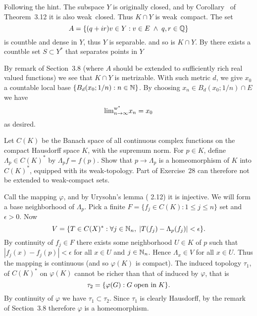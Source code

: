 \begin{enumerate}
\begin{itemize}
Following the hint.
The subspace $Y$ is originally closed, and by Corollary~
of Theorem~3.12 it is also weak\upstar\ closed.
Thus \(K \cap Y\) is weak\upstar\ compact.
The set
\begin{equation*}
A = \{(q+ir)v \in Y: v\in E \;\wedge\; q,r \in \mathbb{Q}\}
\end{equation*}
is countble and dense in $Y$, thus $Y$ is separable.
and so is \(K \cap Y\).
By  there exists a countble set \(S \subset Y^*\) that separates
points in $Y$

By remark  of Section~3.8
(where $A$ should be extended to sufficiently rich real valued functions)
we see that  \(K \cap Y\) is metrizable.
With such metric $d$, we give \(x_0\) a countable local base
 \(\{B_d(x_0;1/n): n\in\mathbb{N}\}\).
By choosing \(x_n \in B_d(x_0;1/n) \cap E\) we have 
\begin{equation*}
{\lim}_{n\to\infty}^{\textnormal{w}^*} x_n = x_0
\end{equation*}
as desired.
\end{itemize}


\begin{excopy}
Let \(C(K)\) be the Banach space of all continuous complex functions on the
compact Hausdorff space $K$, with the supremum norm.
For \(p\in K\), define \(\Lambda_p\in C(K)^*\) by \(\Lambda_p f = f(p)\).
Show that \(p \to \Lambda_p\) is a homeomorphism of $K$ into \(C(K)^*\),
equipped with its weak\upstar-topology. Part  of Exercise~28
can therefore not be extended to weak\upstar-compact sets.
\end{excopy}

Call the mapping  \(\varphi\), and
by Urysohn's lemma (\cite{RudinRCA87} 2.12)
it is injective.
We will form a base neighborhood of \(\Lambda_p\).
Pick a finite \(F = \{f_j\in C(K): 1 \leq j \leq n\}\) set 
and \(\epsilon > 0\). Now
\begin{equation*}
V = \{T \in C(X)^*: \forall j\in\mathbb{N}_n,\; |T(f_j) - \Lambda_p(f_j)| < \epsilon\}.
\end{equation*}
By continuity of \(f_j\in F\) there exists some neighborhood \(U \in K\)
of $p$ such that \(|f_j(x) - f_j(p)| < \epsilon\)
for all \(x\in U\) and \(j\in\mathbb{N}_n\).
Hence \(\Lambda_x \in V\) for all \(x\in U\).
Thus the mapping is continuous (and so \(\varphi(K)\) is compact).
The induced topology \(\tau_1\), of \(C(K)^*\) on \(\varphi(K)\)
cannot be richer than that of induced by \(\varphi\), that is
\begin{equation*}
\tau_2 = \{\varphi(G): G \;\textnormal{open in}\; K\}.
\end{equation*}
By continuity of \(\varphi\) we have \(\tau_1 \subset \tau_2\).
Since \(\tau_1\) is clearly Hausdorff, by the remark~
of Section~3.8 therefore \(\varphi\) is a homeomorphism.



\end{enumerate}
